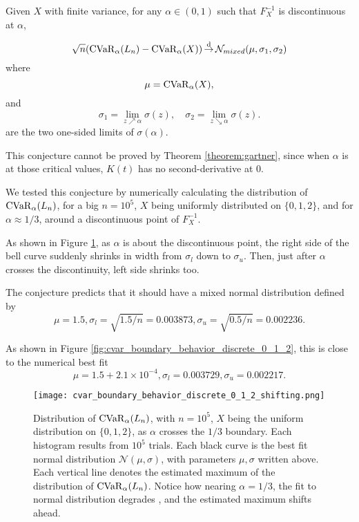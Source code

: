 \begin{conj}
	\label{conj:mixed_gaussian}
	Given $X$ with finite variance, for any $\alpha \in(0, 1)$ such that $F_X^{-1}$ is discontinuous at $\alpha$,  
	
	\begin{equation}
	\sqrt{n}(\operatorname{CVaR}_\alpha(L_n) - \operatorname{CVaR}_\alpha(X)) \operatorname*{\stackrel{\text {d}}{\to}} \mathcal{N}_{mixed}(\mu, \sigma_1, \sigma_2)
	\end{equation}
	where 
	\begin{equation}
	\mu = \operatorname{CVaR}_\alpha(X),
	\end{equation}
	and 
	\begin{equation}
	\sigma_1 = \lim_{z \nearrow \alpha}\sigma(z), \quad
	\sigma_2 = \lim_{z \searrow \alpha}\sigma(z).
	\end{equation}
	are the two one-sided limits of $\sigma(\alpha)$.
\end{conj}


This conjecture cannot be proved by Theorem \ref{theorem:gartner}, since when $\alpha$ is at those critical values, $K(t)$ has no second-derivative at $0$.

We tested this conjecture by numerically calculating the distribution of\\ $\operatorname{CVaR}_\alpha(L_n)$, for a big $n = 10^5$, $X$ being uniformly distributed on $\{0, 1, 2\}$, and for $\alpha\approx 1/3$, around a discontinuous point of $F_X^{-1}$. 

As shown in Figure \ref{fig:cvar_boundary_behavior_discrete_0_1_2_shifting}, as $\alpha$ is about the discontinuous point, the right side of the bell curve suddenly shrinks in width from $\sigma_l$ down to $\sigma_u$. Then, just after $\alpha$ crosses the discontinuity, left side shrinks too.

The conjecture predicts that it should have a mixed normal distribution defined by 
$$\mu = 1.5, \sigma_l = \sqrt{1.5/n} = 0.003873 , \sigma_u = \sqrt{0.5/n} = 0.002236.$$

As shown in Figure \ref{fig:cvar_boundary_behavior_discrete_0_1_2}, this is close to the numerical best fit
$$\mu = 1.5 + 2.1\times 10^{-4}, \sigma_l = 0.003729, \sigma_u = 0.002217.$$

\begin{figure}
	\centering
	\texttt{[image: cvar\_boundary\_behavior\_discrete\_0\_1\_2\_shifting.png]}
	\caption{Distribution of $\operatorname{CVaR}_{\alpha}(L_n)$, with $n=10^5$, $X$ being the uniform distribution on $\{0, 1, 2\}$, as $\alpha$ crosses the $1/3$ boundary. Each histogram results from $10^5$ trials. Each black curve is the best fit normal distribution $\mathcal{N}(\mu, \sigma)$, with parameters $\mu, \sigma$ written above. Each vertical line denotes the estimated maximum of the distribution of $\operatorname{CVaR}_\alpha(L_n)$. Notice how nearing $\alpha=1/3$, the fit to normal distribution degrades , and the estimated maximum shifts ahead.}
	\label{fig:cvar_boundary_behavior_discrete_0_1_2_shifting}
\end{figure}

